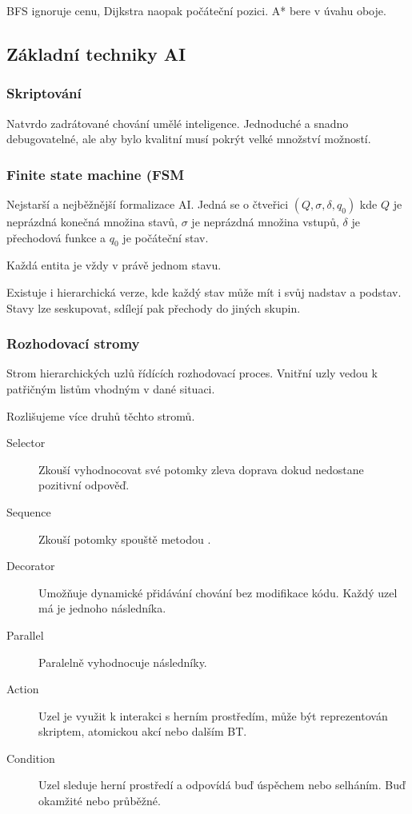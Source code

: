 BFS ignoruje cenu, Dijkstra naopak počáteční pozici.
A* bere v úvahu oboje.

\subsection*{Základní techniky AI}

\subsubsection*{Skriptování}

Natvrdo zadrátované chování umělé inteligence.
Jednoduché a snadno debugovatelné, ale aby bylo kvalitní musí pokrýt velké množství možností.

\subsubsection*{Finite state machine (FSM}

Nejstarší a nejběžnější formalizace AI.
Jedná se o čtveřici \((Q, \sigma, \delta, q_0)\) kde \(Q\) je neprázdná konečná množina stavů, \(\sigma\) je neprázdná množina vstupů, \(\delta\) je přechodová funkce a \(q_0\) je počáteční stav.

Každá entita je vždy v právě jednom stavu.

Existuje i hierarchická verze, kde každý stav může mít i svůj nadstav a podstav.
Stavy lze seskupovat, sdílejí pak přechody do jiných skupin.

\subsubsection*{Rozhodovací stromy}

Strom hierarchických uzlů řídících rozhodovací proces.
Vnitřní uzly vedou k patřičným listům vhodným v dané situaci.

Rozlišujeme více druhů těchto stromů.

\begin{description}
    \item[Selector] Zkouší vyhodnocovat své potomky zleva doprava dokud nedostane pozitivní odpověď.
    \item[Sequence] Zkouší potomky spouště metodou .
    \item[Decorator] Umožňuje dynamické přidávání chování bez modifikace kódu. Každý uzel má je jednoho následníka.
    \item[Parallel] Paralelně vyhodnocuje následníky.
    \item[Action] Uzel je využit k interakci s herním prostředím, může být reprezentován skriptem, atomickou akcí nebo dalším BT.
    \item[Condition] Uzel sleduje herní prostředí a odpovídá buď úspěchem nebo selháním. Buď okamžité nebo průběžné. 
\end{description}

